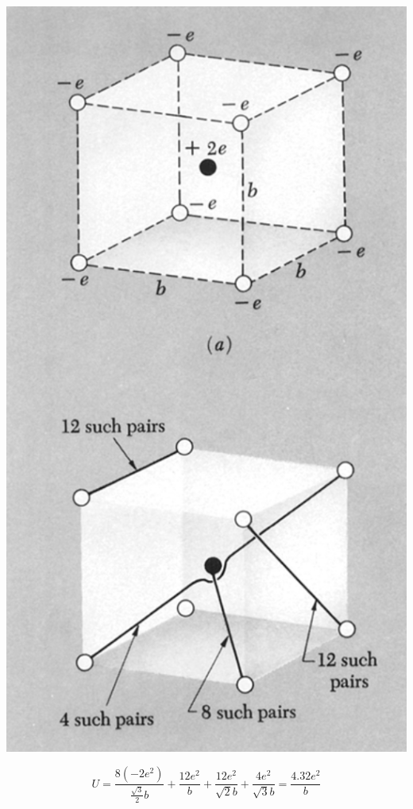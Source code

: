 \documentclass[svgnames]{article}
\begin{document}
\begin{center}
\includegraphics[scale = 0.4]{ss4.png}
\end{center} 


\[ U = \frac{8 (-2e^2)}{\frac{\sqrt{3}}{2}b} + \frac{12e^2}{b} + \frac{12e^2}{\sqrt{2}b} + \frac{4e^2}{\sqrt{3}b} = \frac{4.32e^2}{b} \] \\
\end{document}

